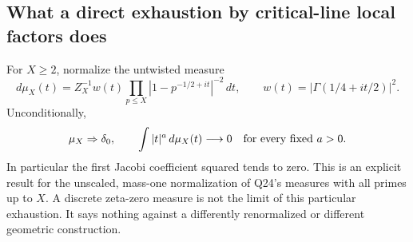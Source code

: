 \subsection{What a direct exhaustion by critical-line local factors does}

\begin{theorem}
\label{AC-S16}
For \(X\geq2\), normalize the untwisted measure
\[
 d\mu_X(t)=Z_X^{-1}w(t)
       \prod_{p\leq X}|1-p^{-1/2+it}|^{-2}\,dt,
 \qquad w(t)=|\Gamma(1/4+it/2)|^2.
\]
Unconditionally,
\[
 \mu_X\Rightarrow\delta_0,
 \qquad \int |t|^a\,d\mu_X(t)\longrightarrow0
                  \quad\hbox{for every fixed }a>0.
\]
In particular the first Jacobi coefficient squared tends to zero.
This is an explicit result for the unscaled, mass-one normalization
of Q24's measures with all primes up to \(X\).  A discrete zeta-zero
measure is not the limit of this particular exhaustion.  It says
nothing against a differently renormalized or different geometric
construction.
\end{theorem}
